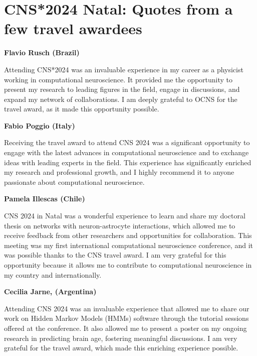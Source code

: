 \section*{CNS*2024 Natal: Quotes from a few travel awardees}%
\sectionauthor{\vspace{-4ex}}

\noindent{}\textbf{Flavio Rusch (Brazil)}
\begin{displayquote}
Attending CNS*2024 was an invaluable experience in my career as a physicist working in computational neuroscience. It provided me the opportunity to present my research to leading figures in the field, engage in discussions, and expand my network of collaborations. I am deeply grateful to OCNS for the travel award, as it made this opportunity possible.
\end{displayquote}

\vspace{2ex}
\noindent{}\textbf{Fabio Poggio (Italy)}
\begin{displayquote}
Receiving the travel award to attend CNS 2024 was a significant opportunity to engage with the latest advances in computational neuroscience and to exchange ideas with leading experts in the field. This experience has significantly enriched my research and professional growth, and I highly recommend it to anyone passionate about computational neuroscience.
\end{displayquote}

\vspace{2ex}
\noindent{}\textbf{Pamela Illescas (Chile)}
\begin{displayquote}
CNS 2024 in Natal was a wonderful experience to learn and share my doctoral thesis on networks with neuron-astrocyte interactions, which allowed
me to receive feedback from other researchers and opportunities for collaboration. This meeting was my first international computational neuroscience conference, and it was possible thanks to the CNS travel award. I am very grateful for this opportunity because it allows me to contribute to computational neuroscience in my country and internationally.
\end{displayquote}

\vspace{2ex}
\noindent{}\textbf{Cecilia Jarne, (Argentina)}
\begin{displayquote}
Attending CNS 2024 was an invaluable experience that allowed me to share our work on Hidden Markov Models (HMMs) software through the tutorial sessions offered at the conference. It also allowed me to present a poster on my ongoing research in predicting brain age, fostering meaningful discussions. I am very grateful for the travel award, which made this enriching experience possible.
\end{displayquote}


